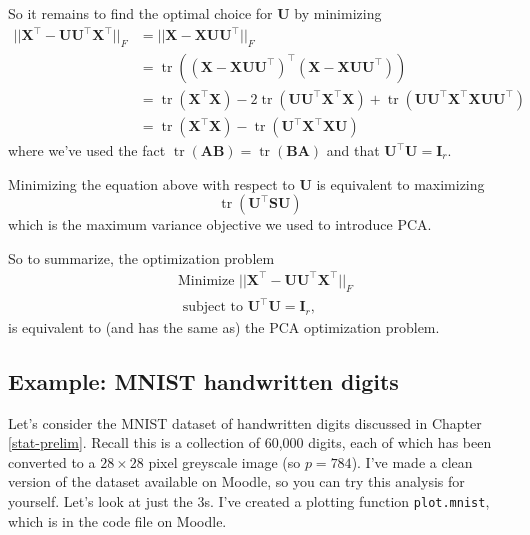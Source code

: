 \documentclass[]{book}
\theoremstyle{definition}
\theoremstyle{definition}
\theoremstyle{definition}
\theoremstyle{remark}
\begin{document}
So it remains to find the optimal choice for \(\mathbf U\) by minimizing
\begin{align*}
||\mathbf X^\top - \mathbf U\mathbf U^\top \mathbf X^\top||_F &=||\mathbf X- \mathbf X\mathbf U\mathbf U^\top ||_F\\
&= \operatorname{tr}((\mathbf X- \mathbf X\mathbf U\mathbf U^\top)^\top(\mathbf X- \mathbf X\mathbf U\mathbf U^\top))\\
&= \operatorname{tr}(\mathbf X^\top \mathbf X) - 2 \operatorname{tr}(\mathbf U\mathbf U^\top \mathbf X^\top\mathbf X) +  \operatorname{tr}(\mathbf U\mathbf U^\top \mathbf X^\top\mathbf X\mathbf U\mathbf U^\top)\\
&= \operatorname{tr}(\mathbf X^\top \mathbf X)  - \operatorname{tr}(\mathbf U^\top \mathbf X^\top \mathbf X\mathbf U) 
\end{align*}
where we've used the fact \(\operatorname{tr}(\mathbf A\mathbf B) = \operatorname{tr}(\mathbf B\mathbf A)\) and that \(\mathbf U^\top \mathbf U=\mathbf I_r\).

Minimizing the equation above with respect to \(\mathbf U\) is equivalent to maximizing
\[\operatorname{tr}(\mathbf U^\top \mathbf S\mathbf U) \]
which is the maximum variance objective we used to introduce PCA.

So to summarize, the optimization problem
\begin{align*}
&\mbox{Minimize } ||\mathbf X^\top -\mathbf U\mathbf U^\top \mathbf X^\top||_F \\
 &\mbox{ subject to } \mathbf U^\top \mathbf U=\mathbf I_r,
 \end{align*}
is equivalent to (and has the same as) the PCA optimization problem.

\hypertarget{example-mnist-handwritten-digits}{%
\subsection{Example: MNIST handwritten digits}\label{example-mnist-handwritten-digits}}

Let's consider the MNIST dataset of handwritten digits discussed in Chapter \ref{stat-prelim}. Recall this is a collection of 60,000 digits, each of which has been converted to a \(28\times 28\) pixel greyscale image (so \(p=784\)).
I've made a clean version of the dataset available on Moodle, so you can try this analysis for yourself. Let's look at just the 3s. I've created a plotting function \texttt{plot.mnist}, which is in the code file on Moodle.
\end{document}

